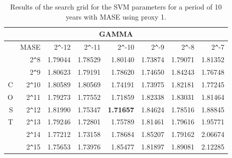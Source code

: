 \begin{table}[h!]
\centering
\begin{adjustbox}{width=0.9\textwidth}
\begin{tabular}{|r|r|rrrrrr|}
\hline
\multicolumn{8}{|c|}{GAMMA} \tabularnewline
\hline
 &MASE& 2\verb|^|-12 & 2\verb|^|-11 & 2\verb|^|-10 & 2\verb|^|-9 & 2\verb|^|-8 & 2\verb|^|-7 \\ 
  \hline
  &2\verb|^|8 & 1.79044 & 1.78529 & 1.80140 & 1.73874 & 1.79071 & 1.81352 \\ 
  &2\verb|^|9 & 1.80623 & 1.79191 & 1.78620 & 1.74650 & 1.84243 & 1.76748 \\ 
  C&2\verb|^|10 & 1.80589 & 1.80569 & 1.74191 & 1.73975 & 1.82181 & 1.77245 \\ 
  O&2\verb|^|11 & 1.79273 & 1.77552 & 1.71859 & 1.82338 & 1.83031 & 1.81464 \\ 
  S&2\verb|^|12 & 1.81990 & 1.75347 & \textbf{1.71657} & 1.84624 & 1.78516 & 1.88845 \\ 
  T&2\verb|^|13 & 1.79246 & 1.72801 & 1.75789 & 1.81461 & 1.79616 & 1.95771 \\ 
  &2\verb|^|14 & 1.77212 & 1.73158 & 1.78684 & 1.85207 & 1.79162 & 2.06674 \\ 
  &2\verb|^|15 & 1.75653 & 1.73976 & 1.85477 & 1.81897 & 1.89081 & 2.12285 \\ 
   \hline
\end{tabular}
\end{adjustbox}
\caption{Results of the search grid for the SVM parameters for a period of 10 years with MASE using proxy 1.}
\end{table}